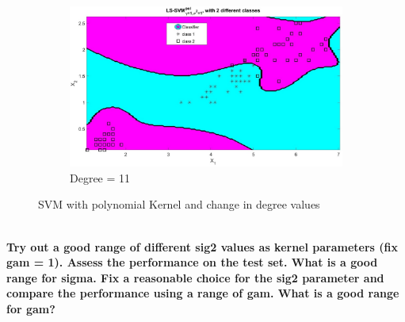 {\begin{figure}[!htbp]
 	\begin{subfigure}{.33\textwidth}
 		\centering
 		\includegraphics[height=0.8\linewidth,width=1\linewidth]{Exercise1/Report/Ex1.3_deg(11).jpg}
 		\caption{Degree = 11}
 		\label{fig:deg(11)}
 	\end{subfigure}%
 	\caption{SVM with polynomial Kernel and change in degree values}
 	\label{fig:deg}
 \end{figure}\\
 \textbf{Try out a good range of different sig2 values as kernel parameters (fix gam = 1). Assess the performance on the test set. What is a good range for sigma. Fix a reasonable choice for the sig2 parameter and compare the performance using a range of gam. What is a good range for gam?}

}
